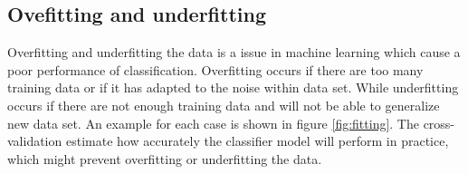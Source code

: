 \documentclass[USenglish]{ifimaster}  %
\begin{document}
\subsection{Ovefitting and underfitting}
Overfitting and underfitting the data is a issue in machine learning which cause a poor performance of classification. Overfitting occurs if there are too many training data or if it has adapted to the noise within data set. While underfitting occurs if there are not enough training data and will not be able to generalize new data set. An example for each case is shown in figure \ref{fig:fitting}. The cross-validation estimate how accurately the classifier model will perform in practice, which might prevent overfitting or underfitting the data.

\end{document}

